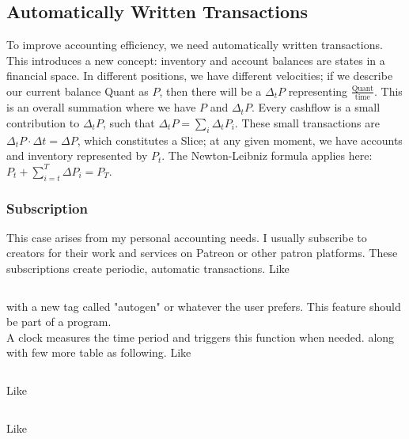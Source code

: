 \subsection{Automatically Written Transactions}
To improve accounting efficiency, we need automatically
written transactions. This introduces a new concept:
inventory and account balances are states in a
financial space. In different positions, we have different
velocities; if we describe our current balance Quant
as $P$, then there will be a $\Delta_t P$ representing
$\frac{\text{Quant}}{\text{time}}$.
This is an overall summation where we have $P$
and $\Delta_t P$. Every cashflow is a small contribution to
$\Delta_t P$, such that $\Delta_t P=\sum_{i}\Delta_t P_i$.
These small transactions are $\Delta_t P \cdot \Delta t = \Delta P$, which constitutes
a Slice; at any given moment, we have accounts and inventory
represented by $P_t$.
The Newton-Leibniz formula applies here:
$P_t + \sum_{i=t}^{T} \Delta P_i = P_T$.

\subsubsection{Subscription}
This case arises from my personal accounting needs.
I usually subscribe to creators for their work and
services on Patreon or other patron platforms.
These subscriptions create periodic, automatic
transactions.
Like \inputminted{json}{jsonobs/automatically-written-transaction-1.json}
with a new tag called "autogen" or whatever the user prefers.
This feature should be part of a program.\\
A clock measures the time period and
triggers this function when needed.
along with few more table as following.
Like \inputminted{json}{jsonobs/automatically-written-transaction-P.json}
Like \inputminted{json}{jsonobs/automatically-written-transaction-dP.json}
Like \inputminted{json}{jsonobs/automatically-written-transaction-units.json}

